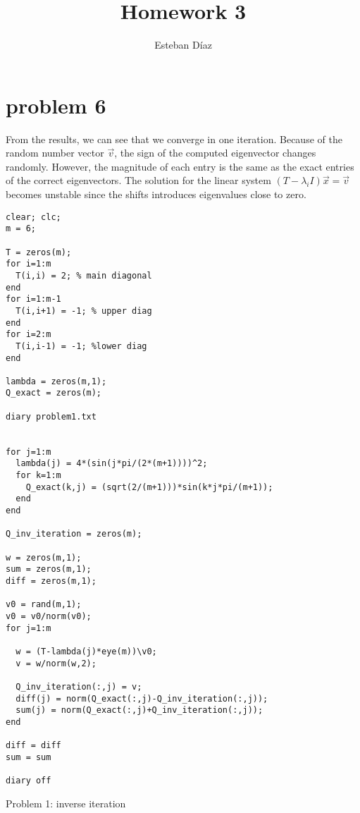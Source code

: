 \documentclass[10pt]{article}
\author{Esteban D\'{i}az}
\title{Homework 3}{}
\begin{document}
\maketitle

\section{problem 6}
From the results, we can see that we converge in one iteration. Because of 
the random number vector $\vec{v}$, the sign of the computed eigenvector
changes randomly. However, the magnitude of each entry is the same as
the exact entries of the correct eigenvectors. The solution for
the linear system $(T-\lambda_i I) \vec{x} = \vec{v}$ becomes unstable
since the shifts introduces eigenvalues close to zero. 

\begin{program}
\begin{verbatim}
clear; clc;
m = 6;

T = zeros(m);
for i=1:m
  T(i,i) = 2; % main diagonal
end
for i=1:m-1
  T(i,i+1) = -1; % upper diag
end
for i=2:m
  T(i,i-1) = -1; %lower diag
end

lambda = zeros(m,1);
Q_exact = zeros(m);

diary problem1.txt


for j=1:m
  lambda(j) = 4*(sin(j*pi/(2*(m+1))))^2;
  for k=1:m
    Q_exact(k,j) = (sqrt(2/(m+1)))*sin(k*j*pi/(m+1));
  end
end

Q_inv_iteration = zeros(m);

w = zeros(m,1);
sum = zeros(m,1);
diff = zeros(m,1);

v0 = rand(m,1);
v0 = v0/norm(v0);
for j=1:m
  
  w = (T-lambda(j)*eye(m))\v0;
  v = w/norm(w,2);
  
  Q_inv_iteration(:,j) = v;
  diff(j) = norm(Q_exact(:,j)-Q_inv_iteration(:,j));
  sum(j) = norm(Q_exact(:,j)+Q_inv_iteration(:,j));
end

diff = diff
sum = sum

diary off
\end{verbatim}
  \caption{Problem 1: inverse iteration}
\end{program}
\end{document}
